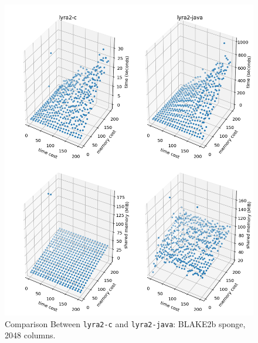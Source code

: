 \begin{figure}[p]
    \centering
    \includegraphics[width=\linewidth,keepaspectratio]{figures/tcost_mcost_blake2b_2048}
    \caption{Comparison Between \texttt{lyra2-c} and \texttt{lyra2-java}: BLAKE2b sponge, 2048 columns.}
    \label{figure:tcost_mcost_blake2b_2048}
\end{figure}

